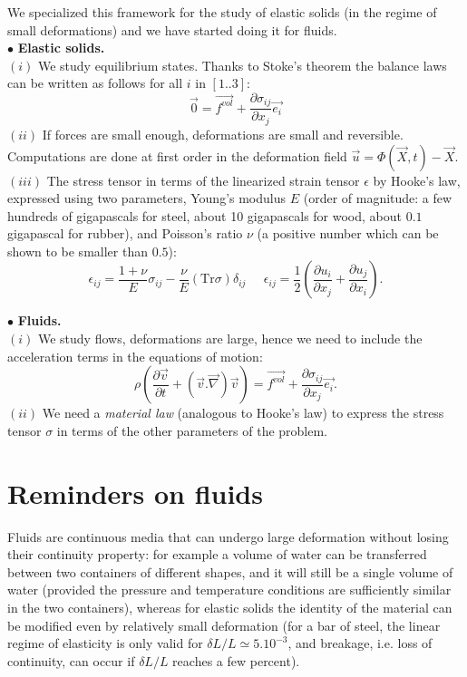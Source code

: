 \documentclass[DIV=12]{article}
\newcommand{\fVol}{\vec{f^{vol}}}
\newcommand{\Tr}{\mathrm{Tr}}
\begin{document}
We specialized this framework for the study of elastic solids (in the regime of small deformations) and we have started doing it for 
 fluids.\\

$\bullet$ {\bf{Elastic solids.}}\\
 $(i)$ We study equilibrium states. Thanks to Stoke's theorem the balance laws can be written as follows for all $i$ in $[1..3]$:\\
 \begin{equation}
\vec{0} = \fVol + \frac{\partial \sigma_{ij}}{\partial x_j} \vec{e_i}
 \end{equation}
 $(ii)$ If forces are small enough, deformations are small and reversible. Computations are done at first order in the 
 deformation field $\vec{u} = \Phi( \vec{X}, t ) - \vec{X}$.\\
 $(iii)$ The stress tensor in terms of the linearized strain tensor $\epsilon$ by Hooke's law,
 expressed using two parameters, Young's modulus $E$ (order of magnitude: a few hundreds of gigapascals for steel, about 10 gigapascals for wood, about $0.1$ gigapascal for rubber),
 and Poisson's ratio $\nu$ (a positive number which can be shown to be smaller than $0.5$):\\
 \begin{equation}
 \epsilon_{ij} = \frac{1+\nu}{E}\sigma_{ij} -\frac{\nu}{E}(\Tr\sigma)\delta_{ij}\;\;\;\;\; \epsilon_{ij} = \frac{1}{2}\left( \frac{\partial u_i}{\partial x_j}+\frac{\partial u_j}{\partial x_i} \right) .
\end{equation}

$\bullet$ {\bf{Fluids.}}\\
 $(i)$ We study flows, deformations are large, hence we need to include the acceleration terms in the equations of motion:\\
 \begin{equation}
\rho\left( \frac{\partial \vec{v}}{\partial t} + ( \vec{v}.\vec{\nabla}) \vec{v} \right)= \fVol + \frac{\partial \sigma_{ij}}{\partial x_j} \vec{e_i}.
 \label{eomFluids}
 \end{equation}
$(ii)$ We need a {\emph{material law}} (analogous to Hooke's law) to express the stress tensor $\sigma$ in terms of the 
 other parameters of the problem.\\


\section{Reminders on fluids}
 Fluids are continuous media that can undergo large deformation
 without losing their continuity property: for example a volume of water can be 
transferred between two containers of different shapes, and it will still be
 a single volume of water (provided the pressure and temperature conditions are sufficiently
 similar in the two containers), whereas for elastic solids the identity 
 of the material can be modified even by relatively small deformation (for a bar of steel,
 the linear regime of elasticity is only valid for $\delta L /L \simeq 5.10^{-3}$, 
 and breakage, i.e. loss of continuity, can occur if $\delta L/L$ reaches a few percent).\\
\end{document}
